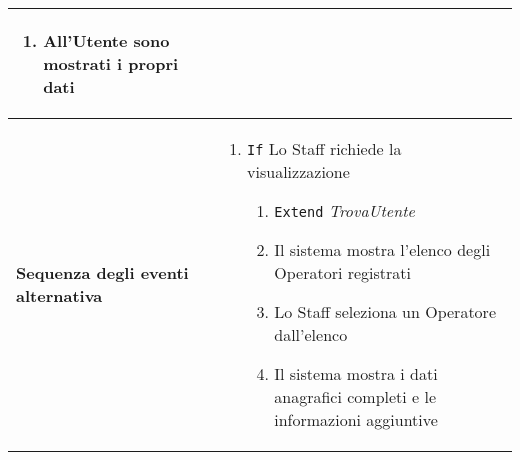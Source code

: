 \documentclass[a4paper]{report}
\begin{document}
\begin{table}[H]
\begin{tabular}{|p{3.9cm}|p{9.9cm}|}
\begin{enumerate}[leftmargin=14pt,label=\arabic*.,labelsep=0.5em,topsep=0pt,partopsep=0pt,parsep=0pt,itemsep=0pt]
    \item All’Utente sono mostrati i propri dati
    \end{enumerate} \\ \hline
\textbf{Sequenza degli eventi alternativa} & \begin{enumerate}[leftmargin=14pt,label=\arabic*.,labelsep=0.5em,topsep=0pt,partopsep=0pt,parsep=0pt,itemsep=0pt] 
    \item \texttt{If} Lo Staff richiede la visualizzazione
    \begin{enumerate}[label=\arabic{enumi}.\arabic*.,leftmargin=22pt,labelsep=0.5em,topsep=0pt,partopsep=0pt,parsep=0pt,itemsep=0pt]
        \item[] \texttt{Extend} \textit{TrovaUtente} 
        \item Il sistema mostra l’elenco degli Operatori registrati
        \item Lo Staff seleziona un Operatore dall’elenco
        \item Il sistema mostra i dati anagrafici completi e le informazioni aggiuntive 
    \end{enumerate}
\end{enumerate}\\ \hline
\end{tabular}
\end{table}
\end{document}
